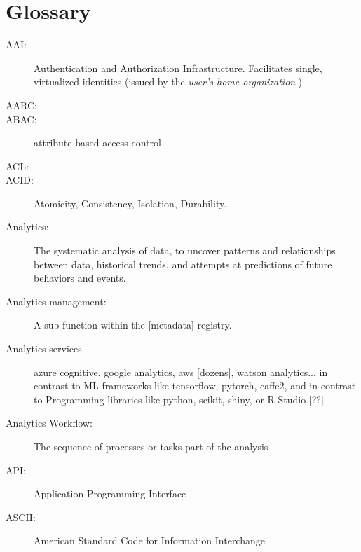 
\section* {Glossary}

\begin{description}

  
\item[AAI:] Authentication and Authorization
  Infrastructure. Facilitates single, virtualized identities (issued
  by the {\em user’s home organization.})

\item[AARC:]     

\item[ABAC:] attribute based access control

\item[ACL:] 

\item[ACID:] Atomicity, Consistency, Isolation, Durability.

\item[Analytics:] The systematic analysis of data, to uncover patterns
  and relationships between data, historical trends, and attempts at
  predictions of future behaviors and events.

\item[Analytics management:] A sub function within the [metadata]
  registry.

\item[Analytics services] azure cognitive, google analytics, aws
  [dozens], watson analytics... in contrast to ML frameworks like
  tensorflow, pytorch, caffe2, and in contrast to Programming
  libraries like python, scikit, shiny, or R Studio [??]


\item[Analytics Workflow:] The sequence of processes or tasks part of
  the analysis

\item[API:] Application Programming Interface

\item[ASCII:] American Standard Code for Information Interchange


\end{description}
